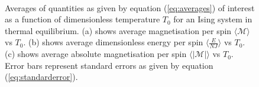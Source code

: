\documentclass[11pt]{iopart}
\begin{document}
\begin{figure}[t]
    \centering
    \quad
     \
          \
 
    \caption{Averages of quantities as given by equation (\ref{eq:averages}) of interest as a function of dimensionless temperature $T_0$ for an Ising system in thermal equilibrium. (a) shows average magnetisation per spin $\langle\mathcal{M}\rangle$ vs $T_0$. (b) shows average dimensionless energy per spin $\langle\frac{E}{NJ}\rangle$ vs $T_0$. (c) shows average absolute magnetisation per spin $\langle|\mathcal{M}|\rangle$ vs $T_0$. Error bars represent standard errors as given by equation (\ref{eq:standarderror}).}
    \label{fig:equilibriumaverages}
\end{figure}
\end{document}
